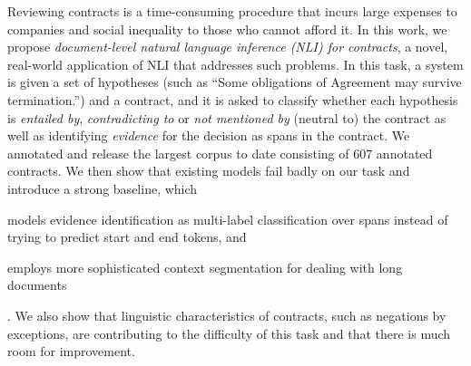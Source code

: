 Reviewing contracts is a time-consuming procedure that incurs large expenses to companies and social inequality to those who cannot afford it.
In this work, we propose \emph{document-level natural language inference (NLI) for contracts}, a novel, real-world application of NLI that addresses such problems.
In this task, a system is given a set of hypotheses (such as ``Some obligations of Agreement may survive termination.'') and a contract, and it is asked to classify whether each hypothesis is \emph{entailed by}, \emph{contradicting to} or \emph{not mentioned by} (neutral to) the contract as well as identifying \emph{evidence} for the decision as spans in the contract.
We annotated and release the largest corpus to date consisting of 607 annotated contracts.
We then show that existing models fail badly on our task and introduce a strong baseline, which \begin{enumerate*}[label=(\arabic*)]
    \item models evidence identification as multi-label classification over spans instead of trying to predict start and end tokens, and
    \item employs more sophisticated context segmentation for dealing with long documents
\end{enumerate*}.
We also show that linguistic characteristics of contracts, such as negations by exceptions, are contributing to the difficulty of this task and that there is much room for improvement.
